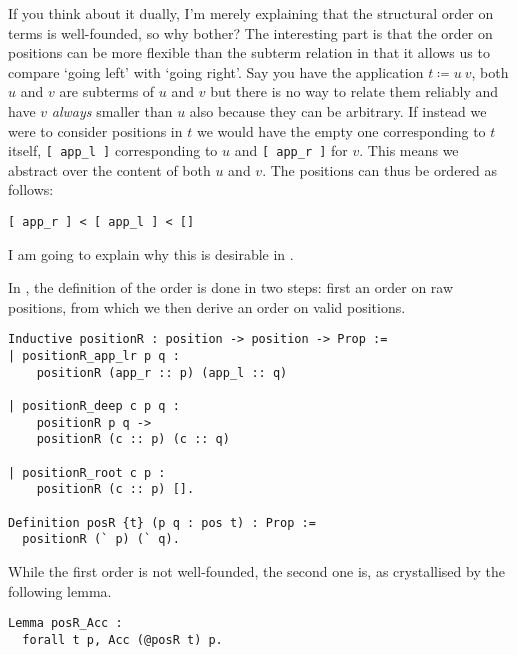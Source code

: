 If you think about it dually, I'm merely explaining that the structural order on
terms is well-founded, so why bother?
The interesting part is that the order on positions can be more flexible than
the subterm relation in that it allows us to compare `going left' with
`going right'.
Say you have the application \(t \coloneqq u\ v\), both \(u\) and \(v\) are
subterms of \(u\) and \(v\) but there is no way to relate them reliably and
have \(v\) \emph{always} smaller than \(u\) also because they can be arbitrary.
If instead we were to consider positions in \(t\) we would have the empty one
corresponding to \(t\) itself, \texttt{[ app_l ]} corresponding to
\(u\) and \texttt{[ app_r ]} for \(v\). This means we abstract over the
content of both \(u\) and \(v\). The positions can thus be ordered as follows:
\begin{verbatim}
[ app_r ] < [ app_l ] < []
\end{verbatim}

I am going to explain why this is desirable in .

In \Coq, the definition of the order is done in two steps: first an order on
raw positions, from which we then derive an order on valid positions.
\begin{verbatim}
Inductive positionR : position -> position -> Prop :=
| positionR_app_lr p q :
    positionR (app_r :: p) (app_l :: q)

| positionR_deep c p q :
    positionR p q ->
    positionR (c :: p) (c :: q)

| positionR_root c p :
    positionR (c :: p) [].

Definition posR {t} (p q : pos t) : Prop :=
  positionR (` p) (` q).
\end{verbatim}

While the first order is not well-founded, the second one is, as crystallised
by the following lemma.
\begin{verbatim}
Lemma posR_Acc :
  forall t p, Acc (@posR t) p.
\end{verbatim}